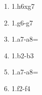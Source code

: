 \begin{enumerate}
\setcounter{enumi}{\value{d_counter}}
\item 1.\pawn{}h6xg7\mate{}
\item 1.\pawn{}g6-g7\mate{}
\item 1.\pawn{}a7-a8=\knight\mate{}
\item 1.\pawn{}b2-b3\mate{}
\item 1.\pawn{}a7-a8=\queen\mate{}
\item 1.\pawn{}f2-f4\mate{}
\setcounter{d_counter}{\value{enumi}}
\end{enumerate}